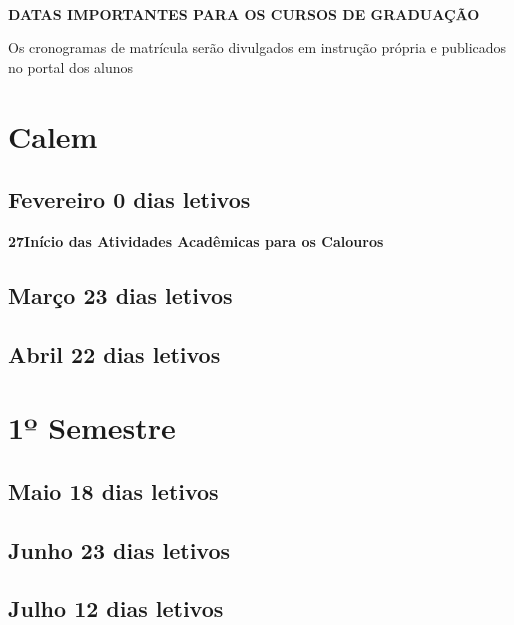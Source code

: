 \documentclass[thesis]{hmcposter}
\begin{document}
\begin{poster}
\vfill
\null
\columnbreak
~
\vfill
\begin{center}
\large \textbf{DATAS IMPORTANTES PARA OS CURSOS DE GRADUAÇÃO}
\newline
\null
\newline
\begin{table}
\centering
{}
\end{table}
\newline
\null
\newline
Os cronogramas de matrícula serão divulgados em instrução própria e publicados no portal dos alunos
\end{center}
\vfill
\null
\newpage\section{\color{hmcorange}Calem}\subsection{Fevereiro \hfill 0 dias letivos}\textbf{27}\qquad \textbf{Início das Atividades Acadêmicas para os Calouros} \newline \null\subsection{Março \hfill 23 dias letivos}\subsection{Abril \hfill 22 dias letivos}\vfill\null
\columnbreak
\section{\hfill \color{hmcorange}1º Semestre}
								\subsection{Maio \hfill 18 dias letivos}\subsection{Junho \hfill 23 dias letivos}\subsection{Julho \hfill 12 dias letivos}\newpage

\end{poster}
\end{document}

